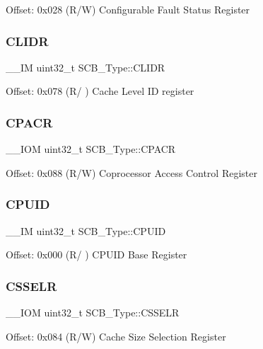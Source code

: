 Offset\+: 0x028 (R/W) Configurable Fault Status Register \mbox{\label{structSCB__Type_ad9899f5775251cf5ef0cb0845527afc2}} 
\subsubsection{\texorpdfstring{CLIDR}{CLIDR}}
{\footnotesize\ttfamily \+\_\+\+\_\+\+IM uint32\+\_\+t S\+C\+B\+\_\+\+Type\+::\+C\+L\+I\+DR}

Offset\+: 0x078 (R/ ) Cache Level ID register \mbox{\label{structSCB__Type_ac6a860c1b8d8154a1f00d99d23b67764}} 
\subsubsection{\texorpdfstring{CPACR}{CPACR}}
{\footnotesize\ttfamily \+\_\+\+\_\+\+I\+OM uint32\+\_\+t S\+C\+B\+\_\+\+Type\+::\+C\+P\+A\+CR}

Offset\+: 0x088 (R/W) Coprocessor Access Control Register \mbox{\label{structSCB__Type_a21e08d546d8b641bee298a459ea73e46}} 
\subsubsection{\texorpdfstring{CPUID}{CPUID}}
{\footnotesize\ttfamily \+\_\+\+\_\+\+IM uint32\+\_\+t S\+C\+B\+\_\+\+Type\+::\+C\+P\+U\+ID}

Offset\+: 0x000 (R/ ) C\+P\+U\+ID Base Register \mbox{\label{structSCB__Type_ad3884e8b6504ec63c1eaa8742e94df3d}} 
\subsubsection{\texorpdfstring{CSSELR}{CSSELR}}
{\footnotesize\ttfamily \+\_\+\+\_\+\+I\+OM uint32\+\_\+t S\+C\+B\+\_\+\+Type\+::\+C\+S\+S\+E\+LR}

Offset\+: 0x084 (R/W) Cache Size Selection Register \mbox{\label{structSCB__Type_af3fe705fef8762763b6d61dbdf0ccc3d}} 
